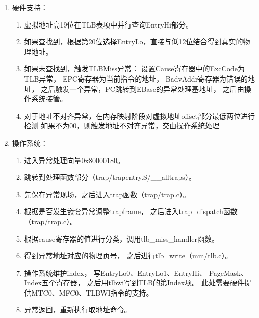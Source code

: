 \begin{enumerate}
            \item
                硬件支持：
                \begin{enumerate}
                \item
                    虚拟地址高19位在TLB表项中并行查询EntryHi部分。
                \item
                    如果查找到，根据第20位选择EntryLo，直接与低12位结合得到真实的物理地址。
                \item
                    如果未查找到，触发TLBMiss异常：%
                    设置Cause寄存器中的ExcCode为TLB异常，%
                    EPC寄存器为当前指令的地址，%
                    BadvAddr寄存器为错误的地址，%
                    之后触发一个异常，PC跳转到EBase的异常处理基地址，%
                    之后由操作系统接管。
                \item
                    对于地址不对齐异常，在内存映射阶段对虚拟地址offset部分最低两位进行检测%
                    如果不为00，则触发地址不对齐异常，交由操作系统处理
                \end{enumerate}
            \item
                操作系统：
                \begin{enumerate}
                \item
                    进入异常处理向量0x80000180。
                \item
                    跳转到处理函数部分（trap/trapentry.S/__alltraps）。
                \item
                    先保存异常现场，之后进入trap函数（trap/trap.c）。
                \item
                    根据是否发生嵌套异常调整trapframe，%
                    之后进入trap_dispatch函数（trap/trap.c）。
                \item
                    根据cause寄存器的值进行分类，调用tlb\_miss\_handler函数。
                \item
                    得到异常地址对应的物理页号，%
                    之后进行tlb\_write（mm/tlb.c）。
                \item
                    操作系统维护index，%
                    写EntryLo0、EntryLo1、EntryHi、 PageMask、Index五个寄存器，%
                    之后用tlbwi写到TLB的第Index项。%
                    此处需要硬件提供MTC0、MFC0、TLBWI指令的支持。
                \item
                    异常返回，重新执行取地址命令。%
                \end{enumerate}
            \end{enumerate}

